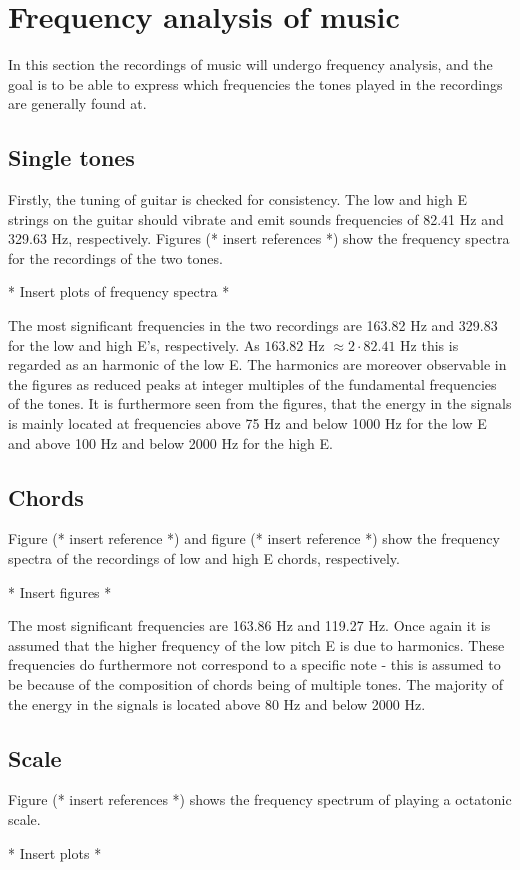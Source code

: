 \section{Frequency analysis of music}
In this section the recordings of music will undergo frequency analysis, and the goal is to be able to express which frequencies the tones played in the recordings are generally found at.

\subsection{Single tones}
Firstly, the tuning of guitar is checked for consistency. The low and high E strings on the guitar should vibrate and emit sounds frequencies of 82.41 Hz and 329.63 Hz, respectively. Figures (* insert references *) show the frequency spectra for the recordings of the two tones.
\begin{center}
* Insert plots of frequency spectra *
\end{center}

The most significant frequencies in the two recordings are 163.82 Hz and 329.83 for the low and high E's, respectively. As $163.82$ Hz $\approx 2\cdot82.41$ Hz this is regarded as an harmonic of the low E. The harmonics are moreover observable in the figures as reduced peaks at integer multiples of the fundamental frequencies of the tones. It is furthermore seen from the figures, that the energy in the signals is mainly located at frequencies above 75 Hz and below 1000 Hz for the low E and above 100 Hz and below 2000 Hz for the high E.

\subsection{Chords}
Figure (* insert reference *) and figure (* insert reference *) show the frequency spectra of the recordings of low and high E chords, respectively.
\begin{center}
* Insert figures *
\end{center}

The most significant frequencies are 163.86 Hz and 119.27 Hz. Once again it is assumed that the higher frequency of the low pitch E is due to harmonics. These frequencies do furthermore not correspond to a specific note - this is assumed to be because of the composition of chords being of multiple tones. The majority of the energy in the signals is located above 80 Hz and below 2000 Hz.

\subsection{Scale}
Figure (* insert references *) shows the frequency spectrum of playing a octatonic scale.
\begin{center}
* Insert plots *
\end{center}

